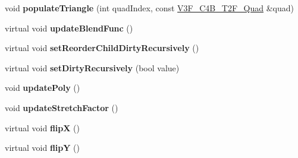 \begin{DoxyCompactItemize}
\item 
\mbox{\label{classSprite_a7b662e062ca13c5e1d83487d747e5eb8}} 
void {\bfseries populate\+Triangle} (int quad\+Index, const \hyperlink{structV3F__C4B__T2F__Quad}{V3\+F\+\_\+\+C4\+B\+\_\+\+T2\+F\+\_\+\+Quad} \&quad)
\item 
\mbox{\label{classSprite_ad56dbbd69c1d7f5252392895b302258e}} 
virtual void {\bfseries update\+Blend\+Func} ()
\item 
\mbox{\label{classSprite_a63f3f5808b390267784256a5b6b20cd4}} 
virtual void {\bfseries set\+Reorder\+Child\+Dirty\+Recursively} ()
\item 
\mbox{\label{classSprite_a94816ba165588c76b84648627b4195f0}} 
virtual void {\bfseries set\+Dirty\+Recursively} (bool value)
\item 
\mbox{\label{classSprite_a56159c5c03204c5b50dd4fa1797b6b56}} 
void {\bfseries update\+Poly} ()
\item 
\mbox{\label{classSprite_a0385634126807797a4a1fc9934a618b2}} 
void {\bfseries update\+Stretch\+Factor} ()
\item 
\mbox{\label{classSprite_a1ed933227efd9ab72bfda44f497ee17a}} 
virtual void {\bfseries flipX} ()
\item 
\mbox{\label{classSprite_ac36b6230b022bcfb828d7bc966d19650}} 
virtual void {\bfseries flipY} ()
\end{DoxyCompactItemize}
